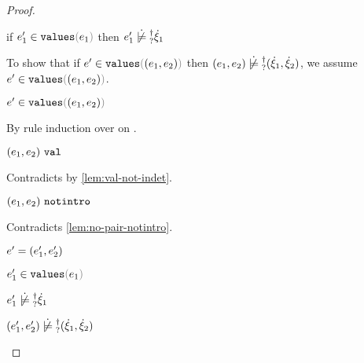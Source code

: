 \begin{proof}
\begin{byCases}
\begin{byCases}
\begin{byCases}
\begin{byCases}
\begin{byCases}
\begin{pfsteps*}
            \item if $\inValues{e_1'}{e_1}$ then $\cnotsatisfyormay{e_1'}{\hxi_1}$  
            \end{pfsteps*} 
            To show that if $\inValues{e'}{\hpair{e_1}{e_2}}$ then $\cnotsatisfyormay{\hpair{e_1}{e_2}}{\cpair{\hxi_1}{\hxi_2}}$, we assume $\inValues{e'}{\hpair{e_1}{e_2}}$.
            \begin{pfsteps*}
            \item $\inValues{e'}{\hpair{e_1}{e_2}}$  
            \end{pfsteps*}
            By rule induction over  on .
            \begin{byCases}
              \item[\text{(\ref{rule:IVVal})}]
              \begin{pfsteps*}
              \item $(e_1 , e_2) ~\mathtt{val}$ 
              \end{pfsteps*} 
              Contradicts  by \autoref{lem:val-not-indet}.
              \item[\text{(\ref{rule:IVIndet})}] 
              \begin{pfsteps*}
              \item $(e_1 , e_2) ~\mathtt{notintro}$ 
              \end{pfsteps*}
              Contradicts \autoref{lem:no-pair-notintro}.
              \item[\text{(\ref{rule:IVPair})}]
              \begin{pfsteps*}
              \item $e'=(e_1' , e_2')$ 
              \item $\inValues{e_1'}{e_1}$  
              \item $\cnotsatisfyormay{e_1'}{\hxi_1}$  
              \item $\cnotsatisfyormay{\hpair{e_1'}{e_2'}}{\cpair{\hxi_1}{\hxi_2}}$ 
              \end{pfsteps*} 

\end{byCases}
\end{byCases}
\end{byCases}
\end{byCases}
\end{byCases}
\end{byCases}
\end{proof}
